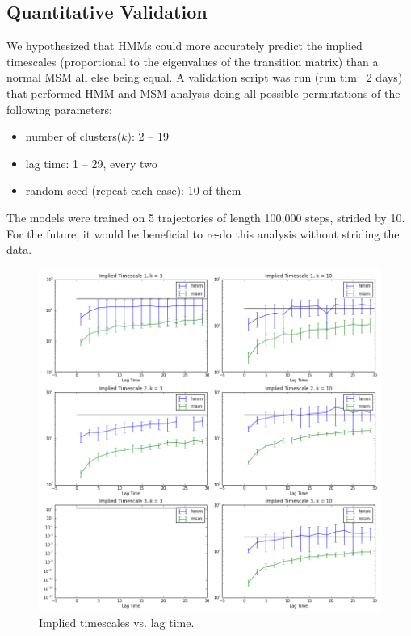 \documentclass[10pt]{article}
\begin{document}
\subsection{Quantitative Validation}

We hypothesized that HMMs could more accurately predict the implied timescales
(proportional to the eigenvalues of the transition matrix) than a normal
MSM all else being equal. A validation script was run (run tim ~2 days) that performed
HMM and MSM analysis doing all possible permutations of the following parameters:

\begin{itemize}
\item number of clusters($k$): 2 -- 19
\item lag time: 1 -- 29, every two
\item random seed (repeat each case): 10 of them
\end{itemize}

The models were trained on 5 trajectories of length 100,000 steps, strided by 10. For the future,
it would be beneficial to re-do this analysis without striding the data.

\begin{figure}[htbp!]
	\centering
	\includegraphics[width=1.0\textwidth]{its_vs_lt.png}
	\caption{Implied timescales vs. lag time.}
	\label{its_vs_lt}
\end{figure}
\end{document}
